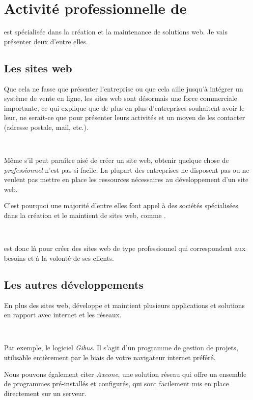 \chapter{Activité professionnelle de \fidit}
\fidit{} est spécialisée dans la création et la maintenance de solutions web. Je vais présenter deux d'entre elles.

\section{Les sites web}
Que cela ne fasse que présenter l'entreprise ou que cela aille jusqu'à intégrer un système de vente en ligne, les sites web sont désormais une force commerciale importante, ce qui explique que de plus en plus d'entreprises souhaitent avoir le leur, ne serait-ce que pour présenter leurs activités et un moyen de les contacter (adresse postale, mail, etc.).

~

Même s'il peut paraître aisé de créer un site web, obtenir quelque chose de \emph{professionnel} n'est pas si facile. La plupart des entreprises ne disposent pas ou ne veulent pas mettre en place les ressources nécessaires au développement d'un site web.

C'est pourquoi une majorité d'entre elles font appel à des sociétés spécialisées dans la création et le maintient de sites web, comme \fidit.

~

\fidit{} est donc là pour créer des sites web de type professionnel qui correspondent aux besoins et à la volonté de ses clients.

\section{Les autres développements}
En plus des sites web, \fidit{} développe et maintient plusieurs applications et solutions en rapport avec internet et les réseaux.

~

Par exemple, le logiciel \emph{Gibus}. Il s'agit d'un programme de gestion de projets, utilisable entièrement par le biais de votre navigateur internet préféré.

Nous pouvons également citer \emph{Axeone}, une solution réseau qui offre un ensemble de programmes pré-installés et configurés, qui sont facilement mis en place directement sur un serveur.
